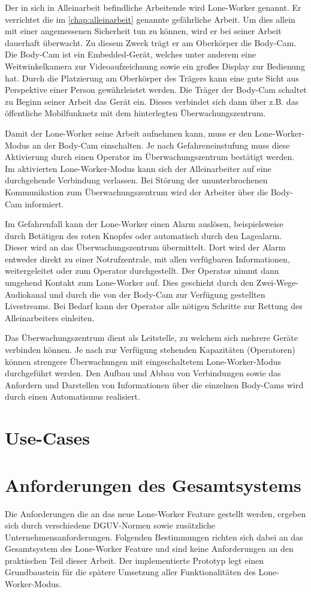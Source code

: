 \documentclass[thesis.tex]{subfiles}
\begin{document}
Der in sich in Alleinarbeit befindliche Arbeitende wird Lone-Worker genannt.
Er verrichtet die im \autoref{chap:alleinarbeit} genannte gefährliche Arbeit.
Um dies allein mit einer angemessenen Sicherheit tun zu können, wird er bei seiner Arbeit dauerhaft überwacht.
Zu diesem Zweck trägt er am Oberkörper die Body-Cam.
Die Body-Cam ist ein Embedded-Gerät, welches unter anderem eine Weitwinkelkamera zur Videoaufzeichnung sowie ein großes Display zur Bedienung hat.
Durch die Platzierung am Oberkörper des Trägers kann eine gute Sicht aus Perspektive einer Person gewährleistet werden.
Die Träger der Body-Cam schaltet zu Beginn seiner Arbeit das Gerät ein.
Dieses verbindet sich dann über z.B. das öffentliche Mobilfunknetz mit dem hinterlegten Überwachungszentrum.

Damit der Lone-Worker seine Arbeit aufnehmen kann, muss er den Lone-Worker-Modus an der Body-Cam einschalten.
Je nach Gefahreneinstufung muss diese Aktivierung durch einen Operator im Überwachungszentrum bestätigt werden.
Im aktivierten Lone-Worker-Modus kann sich der Alleinarbeiter auf eine durchgehende Verbindung verlassen.
Bei Störung der ununterbrochenen Kommunikation zum Überwachungszentrum wird der Arbeiter über die Body-Cam informiert.

Im Gefahrenfall kann der Lone-Worker einen Alarm auslösen, beispielsweise durch Betätigen des roten Knopfes oder automatisch durch den Lagealarm.
Dieser wird an das Überwachungszentrum übermittelt.
Dort wird der Alarm entweder direkt zu einer Notrufzentrale, mit allen verfügbaren Informationen, weitergeleitet oder zum Operator durchgestellt.
Der Operator nimmt dann umgehend Kontakt zum Lone-Worker auf.
Dies geschieht durch den Zwei-Wege-Audiokanal und durch die von der Body-Cam zur Verfügung gestellten Livestreams.
Bei Bedarf kann der Operator alle nötigen Schritte zur Rettung des Alleinarbeiters einleiten.

Das Überwachungszentrum dient als Leitstelle, zu welchem sich mehrere Geräte verbinden können.
Je nach zur Verfügung stehenden Kapazitäten (Operatoren) können strengere Überwachungen mit eingeschaltetem Lone-Worker-Modus durchgeführt werden.
Den Aufbau und Abbau von Verbindungen sowie das Anfordern und Darstellen von Informationen über die einzelnen Body-Cams wird
durch einen Automatismus realisiert.

\section{Use-Cases}
\section{Anforderungen des Gesamtsystems}
Die Anforderungen die an das neue Lone-Worker Feature gestellt werden, ergeben sich durch verschiedene DGUV-Normen sowie zusätzliche Unternehmensanforderungen.
Folgenden Bestimmungen richten sich dabei an das Gesamtsystem des Lone-Worker Feature und sind keine Anforderungen an den praktischen Teil dieser Arbeit.
Der implementierte Prototyp legt einen Grundbaustein für die spätere Umsetzung aller Funktionalitäten des Lone-Worker-Modus.
\end{document}
